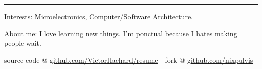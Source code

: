 \documentclass[10pt,letterpaper]{article}
\newenvironment{indentsection}[1]
{\begin{list}{}
  {\setlength{\leftmargin}{#1}} \item[]
}
{\end{list}}
\begin{document}
\hrule
\begin{indentsection}{\parindent}
\begin{description*}
\item[Interests:]
  Microelectronics, Computer/Software Architecture.
\item[About me:]
  I love learning new things. I’m ponctual because I hates making people wait.
\end{description*}
\end{indentsection}


\begin{center}
\footnotesize source code @
\href{http://www.github.com/VictorHachard/resume}
{github.com/VictorHachard/resume} - fork @
\href{http://www.github.com/nixpulvis}
{github.com/nixpulvis}
\end{center}
\end{document}
